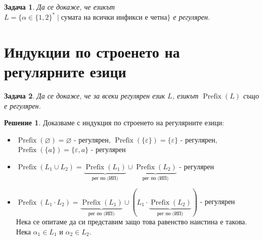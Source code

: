 \documentclass{article}
\newtheorem{problem}{Задача}[section]
\theoremstyle{definition}
\newtheorem*{solution}{Решение}
\begin{document}
\begin{problem}
Да се докаже, че езикът $L = \{ \alpha \in \{ 1, 2 \}^* \mid \text{сумата на всички инфикси е четна} \}$ е регулярен.
\end{problem}

\section{Индукции по строенето на регулярните езици}

\begin{problem}
Да се докаже, че за всеки регулярен език $L$, езикът $\operatorname{Prefix}(L)$ също е регулярен.
\end{problem}

\begin{solution}
    Доказваме с индукция по строенето на регулярните езици:

    \begin{itemize}
        \item $\operatorname{Prefix}(\varnothing) = \varnothing$ - регулярен, $\operatorname{Prefix}(\{ \varepsilon \}) = \{ \varepsilon \}$ - регулярен, $\operatorname{Prefix}(\{a\}) = \{ \varepsilon, a \}$ - регулярен
        \item $\operatorname{Prefix}(L_1 \cup L_2) = \underbrace{\operatorname{Prefix}(L_1)}_{\text{рег по (ИП)}} \cup \underbrace{\operatorname{Prefix}(L_2)}_{\text{рег по (ИП)}}$ - регулярен
        \item $\operatorname{Prefix}(L_1 \cdot L_2) = \underbrace{\operatorname{Prefix}(L_1)}_{\text{рег по (ИП)}} \cup (L_1 \cdot \underbrace{\operatorname{Prefix}(L_2)}_{\text{рег по (ИП)}})$ - регулярен \\
              Нека се опитаме да си представим защо това равенство наистина е такова.
              Нека $\alpha_1 \in L_1$ и $\alpha_2 \in L_2$.


\end{itemize}
\end{solution}
\end{document}
